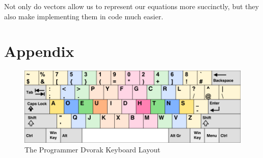 \documentclass[12pt, demo]{article}
\begin{document}
Not only do vectors allow us to represent our equations more succinctly, but they also make implementing them in code much easier.

\section*{Appendix}

\begin{figure}[H]
	\caption{The Programmer Dvorak Keyboard Layout}
	\includegraphics[width=\textwidth]{programmer-dvorak.png}
\end{figure}
\end{document}
